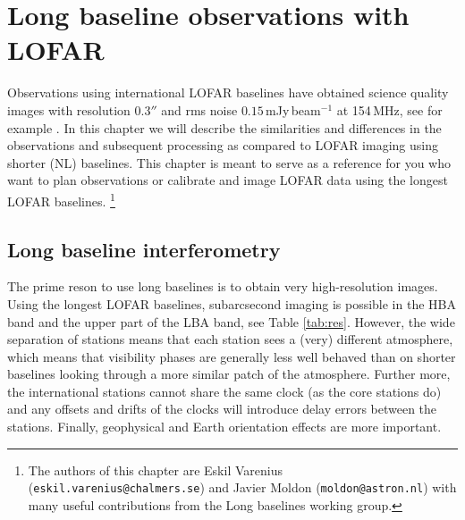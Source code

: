 \chapter{Long baseline observations with LOFAR}
Observations using international LOFAR baselines have obtained science quality
images with resolution 0.3$''$ and rms noise $0.15$\,mJy\,beam$^{-1}$ at
154\,MHz, see for example \cite{varenius2014}. In this chapter we will describe
the similarities and differences in the observations and subsequent processing
as compared to LOFAR imaging using shorter (NL) baselines. This chapter is
meant to serve as a reference for you who want to plan observations or
calibrate and image LOFAR data using the longest LOFAR baselines. 
\footnote{The
authors of this chapter are Eskil Varenius ({\tt eskil.varenius@chalmers.se})
and Javier Moldon ({\tt moldon@astron.nl}) with many useful contributions from the
Long baselines working group.}

\section{Long baseline interferometry}
The prime reson to use long baselines is to obtain very high-resolution images.
Using the longest LOFAR baselines, subarcsecond imaging is possible in the HBA
band and the upper part of the LBA band, see Table \ref{tab:res}.  However, the
wide separation of stations means that each station sees a (very) different
atmosphere, which means that visibility phases are generally less well behaved
than on shorter baselines looking through a more similar patch of the
atmosphere. Further more, the international stations cannot share the same
clock (as the core stations do) and any offsets and drifts of the clocks will
introduce delay errors between the stations. Finally, geophysical and Earth
orientation effects are more important.

